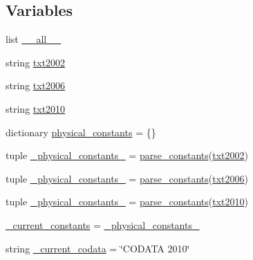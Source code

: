 \subsection*{Variables}
\begin{DoxyCompactItemize}
\item 
list \hyperlink{namespacescipy_1_1constants_1_1codata_a9a503fdec7558b987177559cea4cf88e}{\+\_\+\+\_\+all\+\_\+\+\_\+}
\item 
string \hyperlink{namespacescipy_1_1constants_1_1codata_aacd08b2efc926217fc6c67394cf0cd2a}{txt2002}
\item 
string \hyperlink{namespacescipy_1_1constants_1_1codata_a0090a2524defa9e3fac2ea68737049b4}{txt2006}
\item 
string \hyperlink{namespacescipy_1_1constants_1_1codata_a0b1c94675bc781411bbc33082b1a579d}{txt2010}
\item 
dictionary \hyperlink{namespacescipy_1_1constants_1_1codata_ae2ae2fa33bd2c495fde6185d236e168d}{physical\+\_\+constants} = \{\}
\item 
tuple \hyperlink{namespacescipy_1_1constants_1_1codata_a7fc09da5caed503365c60d0429019d97}{\+\_\+physical\+\_\+constants\+\_} = \hyperlink{namespacescipy_1_1constants_1_1codata_a8df8bd196ec6e0c92cdd03a0dc7ed88e}{parse\+\_\+constants}(\hyperlink{namespacescipy_1_1constants_1_1codata_aacd08b2efc926217fc6c67394cf0cd2a}{txt2002})
\item 
tuple \hyperlink{namespacescipy_1_1constants_1_1codata_ad99a67e187dbee58d4c9199e80bf856a}{\+\_\+physical\+\_\+constants\+\_} = \hyperlink{namespacescipy_1_1constants_1_1codata_a8df8bd196ec6e0c92cdd03a0dc7ed88e}{parse\+\_\+constants}(\hyperlink{namespacescipy_1_1constants_1_1codata_a0090a2524defa9e3fac2ea68737049b4}{txt2006})
\item 
tuple \hyperlink{namespacescipy_1_1constants_1_1codata_a105fd8b3347c3b247d23c97c384a1815}{\+\_\+physical\+\_\+constants\+\_} = \hyperlink{namespacescipy_1_1constants_1_1codata_a8df8bd196ec6e0c92cdd03a0dc7ed88e}{parse\+\_\+constants}(\hyperlink{namespacescipy_1_1constants_1_1codata_a0b1c94675bc781411bbc33082b1a579d}{txt2010})
\item 
\hyperlink{namespacescipy_1_1constants_1_1codata_a4f04c7b64ec166ee658accb7bb8a645c}{\+\_\+current\+\_\+constants} = \hyperlink{namespacescipy_1_1constants_1_1codata_a105fd8b3347c3b247d23c97c384a1815}{\+\_\+physical\+\_\+constants\+\_}
\item 
string \hyperlink{namespacescipy_1_1constants_1_1codata_a5b89217c7b14d7f933a53ba2c2d95c9c}{\+\_\+current\+\_\+codata} = \char`\"{}C\+O\+D\+A\+T\+A 2010\char`\"{}

\end{DoxyCompactItemize}
